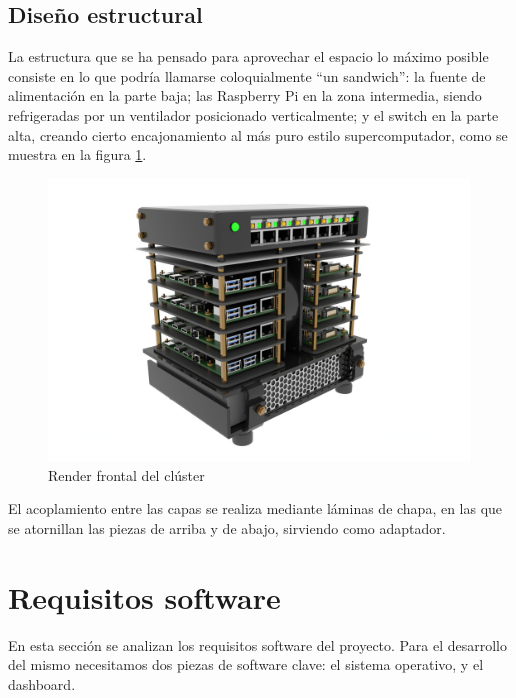 

\subsection{Diseño estructural}
\label{ssec:diseño_estructural}
La estructura que se ha pensado para aprovechar el espacio lo máximo posible consiste en lo que podría llamarse coloquialmente ``un sandwich'': la fuente de alimentación en la parte baja; las Raspberry Pi en la zona intermedia, siendo refrigeradas por un ventilador posicionado verticalmente; y el switch en la parte alta, creando cierto encajonamiento al más puro estilo supercomputador, como se muestra en la figura \ref{fig:render_cluster_1}.

\begin{figure}[h!]
  \centering
  \includegraphics[width=\textwidth]{img/cluster_render_front.jpg}
  \caption{Render frontal del clúster}
  \label{fig:render_cluster_1}
\end{figure}

El acoplamiento entre las capas se realiza mediante láminas de chapa, en las que se atornillan las piezas de arriba y de abajo, sirviendo como adaptador.


\section{Requisitos software}
\label{sec:requisitos_software}
En esta sección se analizan los requisitos software del proyecto. Para el desarrollo del mismo necesitamos dos piezas de software clave: el sistema operativo, y el dashboard.

